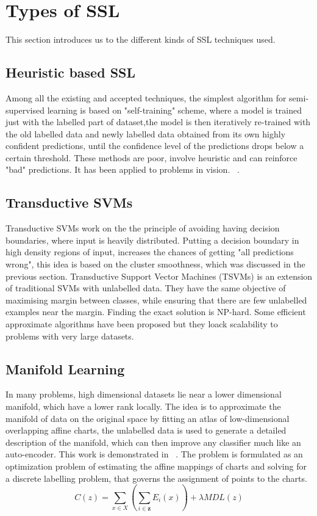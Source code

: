 \documentclass[a4paper,11pt]{kth-mag}
\begin{document}
\section{Types of SSL}
This section introduces us to the different kinds of SSL techniques used.
\subsection{Heuristic based SSL}
Among all the existing and accepted techniques, the simplest algorithm for semi-supervised learning is based on "self-training" scheme, where a model is trained just with the labelled part of dataset,the model is then iteratively re-trained with the old labelled data and newly labelled data obtained from its own highly confident predictions, until the confidence level of the predictions drops below a certain threshold. These methods are poor, involve heuristic and can reinforce "bad" predictions. 
It has been applied to problems in vision. ~\cite{Rosenberg-2005}.
\subsection{Transductive SVMs}
Transductive SVMs work on the the principle of avoiding having decision boundaries, where input is heavily distributed. Putting a decision boundary in high density regions of input, increases the chances of getting "all predictions wrong", this idea is based on the cluster smoothness, which was discussed in the previous section. Transductive Support Vector Machines (TSVMs) is an extension of traditional SVMs with unlabelled data. They have the same objective of maximising  margin between classes, while ensuring that there are few unlabelled examples near the margin. Finding the exact solution is NP-hard. Some efficient approximate algorithms have been proposed but they loack scalability to problems with very large datasets. 
\subsection{Manifold Learning}
In many problems, high dimensional datasets lie near a lower dimensional manifold, which have a lower rank locally. The idea is to approximate the manifold of data on the original space by fitting an atlas of low-dimensional overlapping affine charts, the unlabelled data is used to generate a detailed description of the manifold, which can then improve any classifier much like an auto-encoder. This work is demonstrated in ~\cite{pitelis-2014}. The problem is formulated as an optimization problem of estimating the affine mappings of charts and solving for a discrete labelling problem, that governs the assignment of points to the charts.
\begin{equation}
C(z) = \sum_{x \in X}(\sum_{i \in \textbf{z}}E_{i}(x)) + \lambda MDL(z)
\end{equation}
\end{document}
